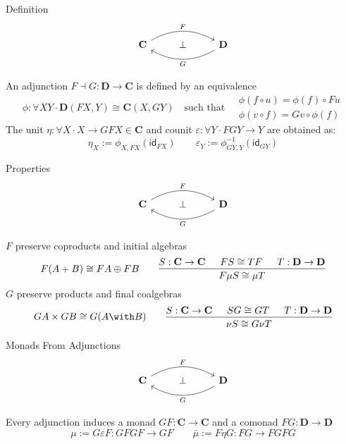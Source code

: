 \documentclass[aspectratio=1610,mathserif]{beamer}
\begin{document}
\begin{frame}[fragile]{Definition}
  \[
    \begin{tikzcd}
      \mathbf{C} \ar[rr, bend left, "F"] &
      \bot &
      \mathbf{D} \ar[ll, bend left, "G"]
    \end{tikzcd}
  \]

  \vfill
  An adjunction $F \dashv G : \mathbf{D} \rightarrow \mathbf{C}$
  is defined by an equivalence
  \[
    \phi : \forall X Y \cdot \mathbf{D}(F X, Y) \cong \mathbf{C}(X, GY)
    \quad \text{such that} \quad
    \begin{array}{c}
      \phi(f \circ u) = \phi(f) \circ F u \\
      \phi(v \circ f) = G v \circ \phi(f)
    \end{array}
  \]
  The unit $\eta : \forall X \cdot X \rightarrow GFX \in \mathbf{C}$
  and counit $\varepsilon : \forall Y \cdot FGY \rightarrow Y$
  are obtained as:
  \[
    \eta_X := \phi_{X,FX}(\mathsf{id}_{FX})
    \qquad
    \varepsilon_Y := \phi^{-1}_{GY, Y}(\mathsf{id}_{GY})
  \]
\end{frame}

\begin{frame}[fragile]{Properties}
  \[
    \begin{tikzcd}
      \mathbf{C} \ar[rr, bend left, "F"] &
      \bot &
      \mathbf{D} \ar[ll, bend left, "G"]
    \end{tikzcd}
  \]

  \vfill
  $F$ preserve coproducts and initial algebras
  \[
    F (A + B) \cong FA \oplus FB
    \qquad
    \begin{prooftree}
      \hypo{S : \mathbf{C} \rightarrow \mathbf{C}}
      \hypo{FS \cong TF}
      \hypo{T : \mathbf{D} \rightarrow \mathbf{D}}
      \infer3{F \mu S \cong \mu T}
    \end{prooftree}
  \]
  $G$ preserve products and final coalgebras
  \[
    GA \times GB \cong G (A \with B)
    \qquad
    \begin{prooftree}
      \hypo{S : \mathbf{C} \rightarrow \mathbf{C}}
      \hypo{SG \cong GT}
      \hypo{T : \mathbf{D} \rightarrow \mathbf{D}}
      \infer3{\nu S \cong G \nu T}
    \end{prooftree}
  \]
\end{frame}

\begin{frame}[fragile]{Monads From Adjunctions}
  \[
    \begin{tikzcd}
      \mathbf{C} \ar[rr, bend left, "F"] &
      \bot &
      \mathbf{D} \ar[ll, bend left, "G"]
    \end{tikzcd}
  \]

  \vfill
  Every adjunction induces a monad $GF : \mathbf{C} \rightarrow \mathbf{C}$
  and a comonad $FG : \mathbf{D} \rightarrow \mathbf{D}$
  \[
    \mu := G \varepsilon F : GFGF \rightarrow GF
    \qquad
    \bar{\mu} := F \eta G : FG \rightarrow FGFG
  \]
\end{frame}
\end{document}
